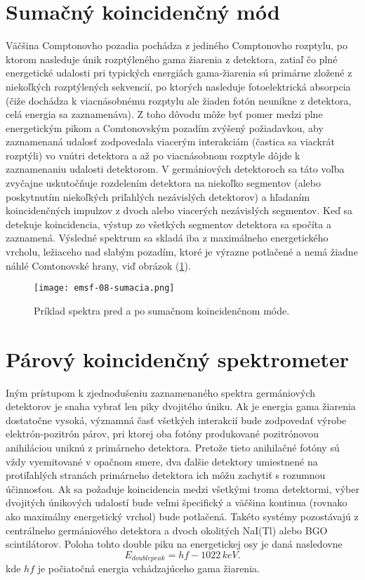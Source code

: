 \documentclass[../../main.tex]{subfiles}
\begin{document}
\section{Sumačný koincidenčný mód}
Väčšina Comptonovho pozadia pochádza z jediného Comptonovho rozptylu, po ktorom nasleduje únik rozptýleného gama žiarenia z detektora, zatiaľ čo plné energetické udalosti pri typických energiách gama-žiarenia sú primárne zložené z niekoľkých rozptýlených sekvencií, po ktorých nasleduje fotoelektrická absorpcia (čiže dochádza k viacnásobnému rozptylu ale žiaden fotón neunikne z detektora, celá energia sa zaznamenáva). Z toho dôvodu môže byť pomer medzi plne energetickým pikom a Comtonovským pozadím zvýšený požiadavkou, aby zaznamenaná udalosť zodpovedala viacerým interakciám (častica sa viackrát rozptýli) vo vnútri detektora a až po viacnásobnom rozptyle dôjde k zaznamenaniu udalosti detektorom. V germániových detektoroch sa táto voľba zvyčajne uskutočňuje rozdelením detektora na niekoľko segmentov (alebo poskytnutím niekoľkých priľahlých nezávislých detektorov) a hľadaním koincidenčných impulzov z dvoch alebo viacerých nezávislých segmentov. Keď sa detekuje koincidencia, výstup zo všetkých segmentov detektora sa spočíta a zaznamená. Výsledné spektrum sa skladá iba z maximálneho energetického vrcholu, ležiaceho nad slabým pozadím, ktoré je výrazne potlačené a nemá žiadne náhlé Comtonovské hrany, viď obrázok (\ref{em8:fig:sumacia}).

\begin{figure}[!h]
\texttt{[image: emsf-08-sumacia.png]}
\centering
\caption{Príklad spektra pred a po sumačnom koincidenčnom móde.}
\label{em8:fig:sumacia}
\end{figure}

\section{Párový koincidenčný spektrometer}
Iným prístupom k zjednodušeniu zaznamenaného spektra germániových detektorov je snaha vybrať len piky dvojitého úniku. Ak je energia gama žiarenia dostatočne vysoká, významná časť všetkých interakcií bude zodpovedať výrobe elektrón-pozitrón párov, pri ktorej oba fotóny produkované pozitrónovou anihiláciou uniknú z primárneho detektora. Pretože tieto anihilačné fotóny sú vždy vyemitované v opačnom smere, dva ďalšie detektory umiestnené na protiľahlých stranách primárneho detektora ich môžu zachytiť s rozumnou účinnosťou. Ak sa požaduje koincidencia medzi všetkými troma detektormi, výber dvojitých únikových udalostí bude veľmi špecifický a väčšina kontinua (rovnako ako maximálny energetický vrchol) bude potlačená. Takéto systémy pozostávajú z centrálneho germániového detektora a dvoch okolitých NaI(Tl) alebo BGO scintilátorov. Poloha tohto double piku na energetickej osy je daná nasledovne
$$ E_{doublepeak} = hf - 1022\,keV.$$
kde $hf$ je počiatočná energia vchádzajúceho gama žiarenia.
\end{document}
